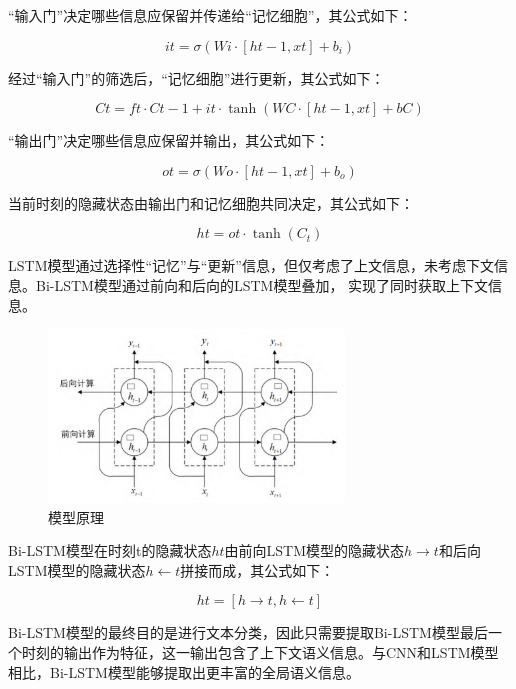 \documentclass[UTF8,a4paper,15pt,titlepage,oneside]{ctexbook}
\begin{document}
“输入门”决定哪些信息应保留并传递给“记忆细胞”，其公式如下：

\begin{equation}
  it = \sigma(Wi \cdot [h{t-1}, xt] + b_i) 
\end{equation}

经过“输入门”的筛选后，“记忆细胞”进行更新，其公式如下：

\begin{equation}
  Ct = ft \cdot C{t-1} + it \cdot \tanh(WC \cdot [h{t-1}, xt] + bC) 
\end{equation}

“输出门”决定哪些信息应保留并输出，其公式如下：

\begin{equation}
  ot = \sigma(Wo \cdot [h{t-1}, xt] + b_o) 
\end{equation}

当前时刻的隐藏状态由输出门和记忆细胞共同决定，其公式如下：

\begin{equation}
  ht = ot \cdot \tanh(C_t) 
\end{equation}

LSTM模型通过选择性“记忆”与“更新”信息，但仅考虑了上文信息，未考虑下文信息。Bi-LSTM模型通过前向和后向的LSTM模型叠加，
实现了同时获取上下文信息。 

\begin{figure}[H]
  \centering
  \includegraphics[width=0.7\textwidth,keepaspectratio=false]{pictures/48.png} %
  \caption{模型原理}
\end{figure}

Bi-LSTM模型在时刻t的隐藏状态$ ht $由前向LSTM模型的隐藏状态$h{\rightarrow t} $和后向LSTM模型的隐藏状态$ h{\leftarrow t} $拼接而成，其公式如下：

\begin{equation}
  ht = [h{\rightarrow t}, h{\leftarrow t}] 
\end{equation}

Bi-LSTM模型的最终目的是进行文本分类，因此只需要提取Bi-LSTM模型最后一个时刻的输出作为特征，这一输出包含了上下文语义信息。与CNN和LSTM模型相比，Bi-LSTM模型能够提取出更丰富的全局语义信息。
\end{document}
